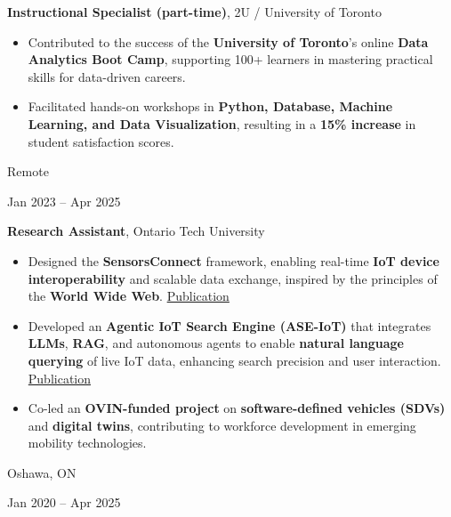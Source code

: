 \documentclass[10pt, letterpaper]{article}
\newenvironment{highlights}{
    \begin{itemize}[
        topsep=0.10 cm,
        parsep=0.10 cm,
        partopsep=0pt,
        itemsep=0pt,
        leftmargin=0.4 cm + 10pt
    ]
}{
    \end{itemize}
} %
\newenvironment{twocolentry}[2][]{
    \onecolentry
    \def\secondColumn{#2}
    \begin{minipage}[t]{\dimexpr\linewidth-4.7cm\relax}
}{
    \end{minipage}\hfill%
    \begin{minipage}[t]{4.5cm}
        \raggedleft\secondColumn
    \end{minipage}
    \endonecolentry
} %
\let\hrefWithoutArrow\href
\renewcommand{\href}[2]{\hrefWithoutArrow{#1}{#2}}
\begin{document}
\vspace{0.2 cm}
\begin{twocolentry}{
    Remote

    Jan 2023 – Apr 2025
}
    \textbf{Instructional Specialist (part-time)}, 2U / University of Toronto

    \begin{highlights}
        \item Contributed to the success of the \textbf{University of Toronto}'s online \textbf{Data Analytics Boot Camp}, supporting 100+ learners in mastering practical skills for data-driven careers.
        \item Facilitated hands-on workshops in \textbf{Python, Database, Machine Learning, and Data Visualization}, resulting in a \textbf{15\% increase} in student satisfaction scores.
    \end{highlights}
\end{twocolentry}

\vspace{0.2cm}

        \begin{twocolentry}{
    Oshawa, ON

    Jan 2020 – Apr 2025
    }
    \textbf{Research Assistant}, Ontario Tech University
    \begin{highlights}
        \item Designed the \textbf{SensorsConnect} framework, enabling real-time \textbf{IoT device interoperability} and scalable data exchange, inspired by the principles of the \textbf{World Wide Web}. \href{https://ieeexplore.ieee.org/document/10752393}{Publication}
        \item Developed an \textbf{Agentic IoT Search Engine (ASE-IoT)} that integrates \textbf{LLMs}, \textbf{RAG}, and autonomous agents to enable \textbf{natural language querying} of live IoT data, enhancing search precision and user interaction. \href{https://arxiv.org/abs/2503.12255}{Publication}
        \item Co-led an \textbf{OVIN-funded project} on \textbf{software-defined vehicles (SDVs)} and \textbf{digital twins}, contributing to workforce development in emerging mobility technologies.
    \end{highlights}
\end{twocolentry}



    
\end{document}
